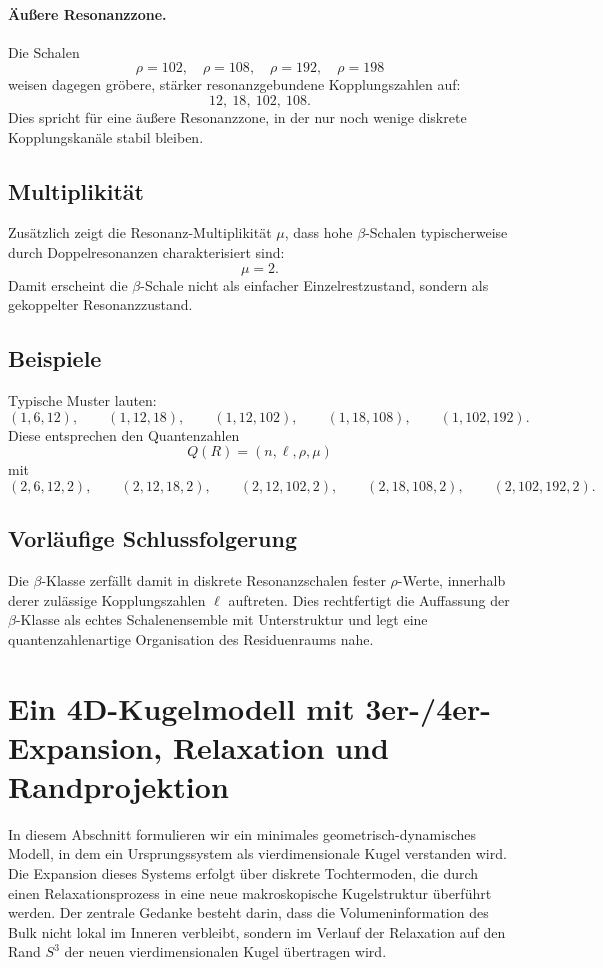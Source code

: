 \documentclass[11pt,a4paper]{article}
\theoremstyle{definition}
\theoremstyle{plain}
\theoremstyle{remark}
\begin{document}
	\paragraph{Äußere Resonanzzone.}
	Die Schalen
	\[
	\rho=102,\quad \rho=108,\quad \rho=192,\quad \rho=198
	\]
	weisen dagegen gröbere, stärker resonanzgebundene Kopplungszahlen auf:
	\[
	12,\ 18,\ 102,\ 108.
	\]
	Dies spricht für eine äußere Resonanzzone, in der nur noch wenige diskrete Kopplungskanäle stabil bleiben.
	
	\subsection{Multiplikität}
	
	Zusätzlich zeigt die Resonanz-Multiplikität \(\mu\), dass hohe \(\beta\)-Schalen typischerweise durch Doppelresonanzen charakterisiert sind:
	\[
	\mu=2.
	\]
	Damit erscheint die \(\beta\)-Schale nicht als einfacher Einzelrestzustand, sondern als gekoppelter Resonanzzustand.
	
	\subsection{Beispiele}
	
	Typische Muster lauten:
	\[
	(1,6,12),\qquad (1,12,18),\qquad (1,12,102),\qquad (1,18,108),\qquad (1,102,192).
	\]
	Diese entsprechen den Quantenzahlen
	\[
	Q(R)=(n,\ell,\rho,\mu)
	\]
	mit
	\[
	(2,6,12,2),\qquad
	(2,12,18,2),\qquad
	(2,12,102,2),\qquad
	(2,18,108,2),\qquad
	(2,102,192,2).
	\]
	
	\subsection{Vorläufige Schlussfolgerung}
	
	Die \(\beta\)-Klasse zerfällt damit in diskrete Resonanzschalen fester \(\rho\)-Werte, innerhalb derer zulässige Kopplungszahlen \(\ell\) auftreten. 
	Dies rechtfertigt die Auffassung der \(\beta\)-Klasse als echtes Schalenensemble mit Unterstruktur und legt eine quantenzahlenartige Organisation des Residuenraums nahe.
	
	
	\section{Ein 4D-Kugelmodell mit 3er-/4er-Expansion, Relaxation und Randprojektion}
	
	In diesem Abschnitt formulieren wir ein minimales geometrisch-dynamisches Modell, in dem ein Ursprungssystem als vierdimensionale Kugel verstanden wird. Die Expansion dieses Systems erfolgt über diskrete Tochtermoden, die durch einen Relaxationsprozess in eine neue makroskopische Kugelstruktur überführt werden. Der zentrale Gedanke besteht darin, dass die Volumeninformation des Bulk nicht lokal im Inneren verbleibt, sondern im Verlauf der Relaxation auf den Rand \(S^3\) der neuen vierdimensionalen Kugel übertragen wird.
	
\end{document}
